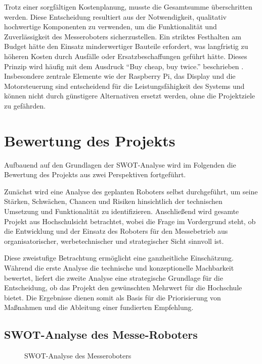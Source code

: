 Trotz einer sorgfältigen Kostenplanung, musste die Gesamtsumme überschritten werden. Diese Entscheidung resultiert aus der Notwendigkeit, qualitativ hochwertige Komponenten zu verwenden, um die Funktionalität und Zuverlässigkeit des Messeroboters sicherzustellen. Ein striktes Festhalten am Budget hätte den Einsatz minderwertiger Bauteile erfordert, was langfristig zu höheren Kosten durch Ausfälle oder Ersatzbeschaffungen geführt hätte. Dieses Prinzip wird häufig mit dem Ausdruck \enquote{Buy cheap, buy twice.} beschrieben \autocite{Farlex.2024}. Insbesondere zentrale Elemente wie der Raspberry Pi, das Display und die Motorsteuerung sind entscheidend für die Leistungsfähigkeit des Systems und können nicht durch günstigere Alternativen ersetzt werden, ohne die Projektziele zu gefährden.

\section{Bewertung des Projekts}
\label{cha:Bewertung des Projekts}

Aufbauend auf den Grundlagen der SWOT-Analyse wird im Folgenden die Bewertung des Projekts aus zwei Perspektiven fortgeführt. 

Zunächst wird eine Analyse des geplanten Roboters selbst durchgeführt, um seine Stärken, Schwächen, Chancen und Risiken hinsichtlich der technischen Umsetzung und Funktionalität zu identifizieren. Anschließend wird gesamte Projekt aus Hochschulsicht betrachtet, wobei die Frage im Vordergrund steht, ob die Entwicklung und der Einsatz des Roboters für den Messebetrieb aus organisatorischer, werbetechnischer und strategischer Sicht sinnvoll ist. 

Diese zweistufige Betrachtung ermöglicht eine ganzheitliche Einschätzung. Während die erste Analyse die technische und konzeptionelle Machbarkeit bewertet, liefert die zweite Analyse eine strategische Grundlage für die Entscheidung, ob das Projekt den gewünschten Mehrwert für die Hochschule bietet. Die Ergebnisse dienen somit als Basis für die Priorisierung von Maßnahmen und die Ableitung einer fundierten Empfehlung.


\subsection{SWOT-Analyse des Messe-Roboters}
\label{cha:SWOT-Analyse des Messe-Roboters}

\begin{figure}[hbt]
	\centering
	
	\vspace{0.5cm}
	\caption{SWOT-Analyse des Messeroboters}		
	\label{fig:SWOTr}
\end{figure}

